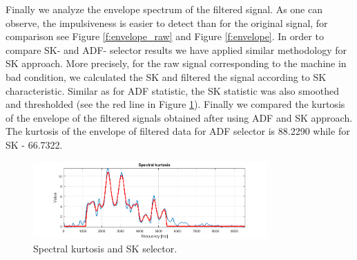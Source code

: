 \documentclass[11pt]{article}
\begin{document}





Finally we analyze the envelope spectrum of the filtered signal. As one can observe, the impulsiveness is easier to detect than for the original signal, for comparison see Figure \ref{f:envelope_raw} and Figure \ref{f:envelope}.
In order to compare SK- and ADF- selector results we have applied similar methodology for SK approach. More precisely, for the raw signal corresponding to the machine in bad condition, we calculated the SK and filtered the signal according to SK characteristic.  Similar as for ADF statistic, the SK statistic was also smoothed and thresholded (see the red line in Figure \ref{f:SK}). Finally we compared the kurtosis of the envelope of the filtered signals obtained after using ADF and SK approach.  The kurtosis of the envelope of filtered data  for ADF selector is 88.2290 while  for SK - 66.7322.

\begin{figure}[!ht]
\begin{center}
\includegraphics[width=0.8\textwidth]{SK2.png}
\caption{Spectral kurtosis and SK selector. \label{f:SK}}
\end{center}
\end{figure}
\end{document}
